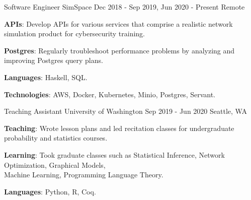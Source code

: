 

\begin{cventries}

  \longdatecventry
    {Software Engineer}
    {SimSpace}
    {Dec 2018 - Sep 2019, Jun 2020 - Present}
    {Remote}
    {
      \begin{cvitems}
        \item {\color{graytext}\textbf{APIs}}: Develop APIs for various services
          that comprise a realistic network simulation product for cybersecurity
          training.
        \item {\color{graytext}\textbf{Postgres}}: Regularly troubleshoot
          performance problems by analyzing and improving Postgres query plans.
        \item {\color{graytext}\textbf{Languages}}: Haskell, SQL.
        \item {\color{graytext}\textbf{Technologies}}: AWS, Docker, Kubernetes,
          Minio, Postgres, Servant.
      \end{cvitems}
    }

  \cventry
    {Teaching Assistant}
    {University of Washington}
    {Sep 2019 - Jun 2020}
    {Seattle, WA}
    {
      \begin{cvitems}
      \item {\color{graytext}\textbf{Teaching}}: Wrote lesson plans and led recitation classes
        for undergraduate probability and statistics courses.
      \item {\color{graytext}\textbf{Learning}}: Took graduate classes such as Statistical Inference, Network
        Optimization, Graphical Models,\\ Machine Learning, Programming Language
        Theory.
        \item {\color{graytext}\textbf{Languages}}: Python, R, Coq.
      \end{cvitems}
    }



\end{cventries}

